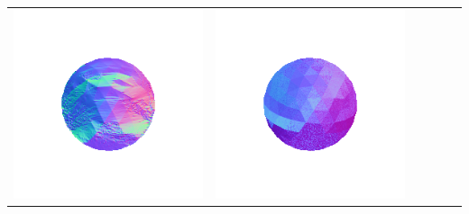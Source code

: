 \begin{center}
\begin{tabularx}{\linewidth}{@{}Y@{}Y@{}Y@{}Y@{}Y@{}Y@{}}
\includegraphics[width=\linewidth]{semisynthetic/20150514_1_yu_out.png} &
\includegraphics[width=\linewidth]{semisynthetic/20150514_1_dpsn_out.png} &

\end{tabularx}
\end{center}
